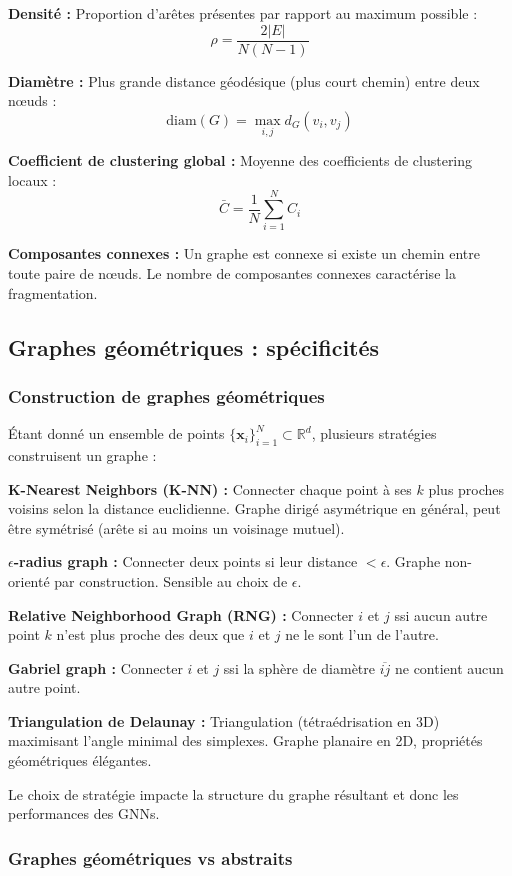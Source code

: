 \textbf{Densité :}
Proportion d'arêtes présentes par rapport au maximum possible :
\[
\rho = \frac{2|E|}{N(N-1)}
\]

\textbf{Diamètre :}
Plus grande distance géodésique (plus court chemin) entre deux nœuds :
\[
\text{diam}(G) = \max_{i,j} d_G(v_i, v_j)
\]

\textbf{Coefficient de clustering global :}
Moyenne des coefficients de clustering locaux :
\[
\bar{C} = \frac{1}{N}\sum_{i=1}^N C_i
\]

\textbf{Composantes connexes :}
Un graphe est connexe si existe un chemin entre toute paire de nœuds. Le nombre de composantes connexes caractérise la fragmentation.

\subsection{Graphes géométriques : spécificités}

\subsubsection{Construction de graphes géométriques}

Étant donné un ensemble de points $\{\mathbf{x}_i\}_{i=1}^N \subset \mathbb{R}^d$, plusieurs stratégies construisent un graphe :

\textbf{K-Nearest Neighbors (K-NN) :}
Connecter chaque point à ses $k$ plus proches voisins selon la distance euclidienne. Graphe dirigé asymétrique en général, peut être symétrisé (arête si au moins un voisinage mutuel).

\textbf{$\epsilon$-radius graph :}
Connecter deux points si leur distance $< \epsilon$. Graphe non-orienté par construction. Sensible au choix de $\epsilon$.

\textbf{Relative Neighborhood Graph (RNG) :}
Connecter $i$ et $j$ ssi aucun autre point $k$ n'est plus proche des deux que $i$ et $j$ ne le sont l'un de l'autre.

\textbf{Gabriel graph :}
Connecter $i$ et $j$ ssi la sphère de diamètre $\overline{ij}$ ne contient aucun autre point.

\textbf{Triangulation de Delaunay :}
Triangulation (tétraédrisation en 3D) maximisant l'angle minimal des simplexes. Graphe planaire en 2D, propriétés géométriques élégantes.

Le choix de stratégie impacte la structure du graphe résultant et donc les performances des GNNs.

\subsubsection{Graphes géométriques vs abstraits}

